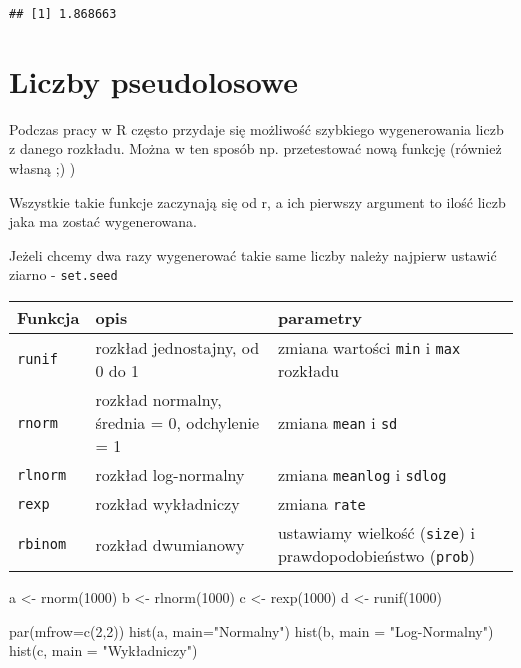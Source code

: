 \documentclass[
]{book}
\newenvironment{Shaded}{\begin{snugshade}}{\end{snugshade}}
\newcommand{\AttributeTok}[1]{\textcolor[rgb]{0.77,0.63,0.00}{#1}}
\newcommand{\DecValTok}[1]{\textcolor[rgb]{0.00,0.00,0.81}{#1}}
\newcommand{\FunctionTok}[1]{\textcolor[rgb]{0.00,0.00,0.00}{#1}}
\newcommand{\NormalTok}[1]{#1}
\newcommand{\OtherTok}[1]{\textcolor[rgb]{0.56,0.35,0.01}{#1}}
\newcommand{\StringTok}[1]{\textcolor[rgb]{0.31,0.60,0.02}{#1}}
\begin{document}
\begin{verbatim}
## [1] 1.868663
\end{verbatim}

\hypertarget{liczby-pseudolosowe}{%
\section{Liczby pseudolosowe}\label{liczby-pseudolosowe}}

Podczas pracy w R często przydaje się możliwość szybkiego wygenerowania liczb z danego rozkładu. Można w ten sposób np. przetestować nową funkcję (również własną ;) )

Wszystkie takie funkcje zaczynają się od r, a ich pierwszy argument to ilość liczb jaka ma zostać wygenerowana.

Jeżeli chcemy dwa razy wygenerować takie same liczby należy najpierw ustawić ziarno - \texttt{set.seed}

\begin{longtable}[]{@{}
  >{\raggedright\arraybackslash}p{}
  >{\raggedright\arraybackslash}p{}
  >{\raggedright\arraybackslash}p{}@{}}
\toprule
Funkcja & opis & parametry \\
\midrule
\endhead
\texttt{runif} & rozkład jednostajny, od 0 do 1 & zmiana wartości \texttt{min} i \texttt{max} rozkładu \\
\texttt{rnorm} & rozkład normalny, średnia = 0, odchylenie = 1 & zmiana \texttt{mean} i \texttt{sd} \\
\texttt{rlnorm} & rozkład log-normalny & zmiana \texttt{meanlog} i \texttt{sdlog} \\
\texttt{rexp} & rozkład wykładniczy & zmiana \texttt{rate} \\
\texttt{rbinom} & rozkład dwumianowy & ustawiamy wielkość (\texttt{size}) i prawdopodobieństwo (\texttt{prob}) \\
\bottomrule
\end{longtable}

\begin{Shaded}
\begin{Highlighting}[]
\NormalTok{a }\OtherTok{\textless{}{-}} \FunctionTok{rnorm}\NormalTok{(}\DecValTok{1000}\NormalTok{)}
\NormalTok{b }\OtherTok{\textless{}{-}} \FunctionTok{rlnorm}\NormalTok{(}\DecValTok{1000}\NormalTok{)}
\NormalTok{c }\OtherTok{\textless{}{-}} \FunctionTok{rexp}\NormalTok{(}\DecValTok{1000}\NormalTok{)}
\NormalTok{d }\OtherTok{\textless{}{-}} \FunctionTok{runif}\NormalTok{(}\DecValTok{1000}\NormalTok{)}

\FunctionTok{par}\NormalTok{(}\AttributeTok{mfrow=}\FunctionTok{c}\NormalTok{(}\DecValTok{2}\NormalTok{,}\DecValTok{2}\NormalTok{))}
\FunctionTok{hist}\NormalTok{(a, }\AttributeTok{main=}\StringTok{"Normalny"}\NormalTok{)}
\FunctionTok{hist}\NormalTok{(b, }\AttributeTok{main =} \StringTok{"Log{-}Normalny"}\NormalTok{)}
\FunctionTok{hist}\NormalTok{(c, }\AttributeTok{main =} \StringTok{"Wykładniczy"}\NormalTok{)}
\end{Highlighting}
\end{Shaded}
\end{document}
